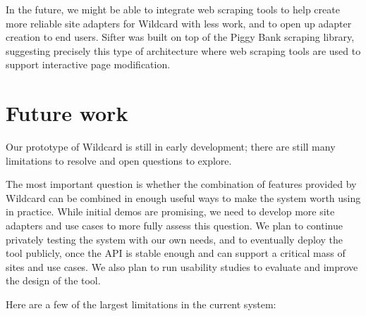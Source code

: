 \documentclass[english,submission]{programming}
\begin{document}
In the future, we might be able to integrate web scraping tools to help
create more reliable site adapters for Wildcard with less work, and to
open up adapter creation to end users. Sifter was built on top of the
Piggy Bank scraping library, suggesting precisely this type of
architecture where web scraping tools are used to support interactive
page modification.

\hypertarget{future-work}{%
\section{Future work}\label{future-work}}

Our prototype of Wildcard is still in early development; there are still
many limitations to resolve and open questions to explore.

The most important question is whether the combination of features
provided by Wildcard can be combined in enough useful ways to make the
system worth using in practice. While initial demos are promising, we
need to develop more site adapters and use cases to more fully assess
this question. We plan to continue privately testing the system with our
own needs, and to eventually deploy the tool publicly, once the API is
stable enough and can support a critical mass of sites and use cases. We
also plan to run usability studies to evaluate and improve the design of
the tool.

Here are a few of the largest limitations in the current system:
\end{document}
